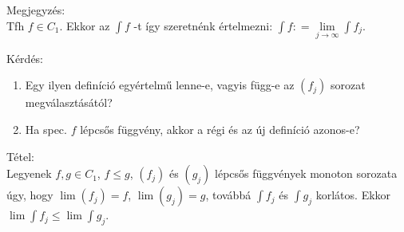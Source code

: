 \documentclass[12pt,a4paper]{scrartcl}
\providecommand{\tightlist}{%
  \setlength{\itemsep}{0pt}\setlength{\parskip}{0pt}}
\newenvironment{tetel}{}{}
\newenvironment{megjegyzes}{}{}
\begin{document}
\begin{megjegyzes}

Megjegyzés:\\
Tfh \(f \in C_{1}\). Ekkor az \(\int f\) -t így szeretnénk értelmezni:
\({\int f}: = \lim\limits_{j\rightarrow\infty}{\int f_{j}}\).

\end{megjegyzes}

Kérdés:

\begin{enumerate}
\def\labelenumi{\arabic{enumi}.}
\tightlist
\item
  Egy ilyen definíció egyértelmű lenne-e, vagyis függ-e az
  \(\left( f_{j} \right)\) sorozat megválasztásától?
\item
  Ha spec. \(f\) lépcsős függvény, akkor a régi és az új definíció
  azonos-e?
\end{enumerate}

\begin{tetel}

Tétel:\\
Legyenek \(f,g \in C_{1}\), \(f \leq g\), \(\left( f_{j} \right)\) és
\(\left( g_{j} \right)\) lépcsős függvények monoton sorozata úgy, hogy
\(\lim\left( f_{j} \right) = f\), \(\lim\left( g_{j} \right) = g\),
továbbá \(\int f_{j}\) és \(\int g_{j}\) korlátos. Ekkor
\(\lim{\int f_{j}} \leq \lim{\int g_{j}}\).

\end{tetel}
\end{document}
